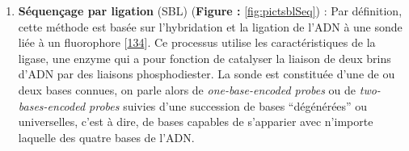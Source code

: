 \documentclass[12pt,a4paper,twoside]{ugathesis}
\providecommand{\tightlist}{%
  \setlength{\itemsep}{0pt}\setlength{\parskip}{0pt}}
\theoremstyle{definition}
\theoremstyle{definition}
\theoremstyle{definition}
\theoremstyle{remark}
\begin{document}
\newpage

\begin{enumerate}
\def\labelenumi{\arabic{enumi}.}
\setcounter{enumi}{1}
\tightlist
\item
  \textbf{Séquençage par ligation} (SBL) (\textbf{Figure :
  }\ref{fig:pictsblSeq}) : Par définition, cette méthode est basée sur
  l'hybridation et la ligation de l'ADN à une sonde liée à un
  fluorophore {[}\protect\hyperlink{ref-Tomkinson2006}{134}{]}. Ce
  processus utilise les caractéristiques de la ligase, une enzyme qui a
  pour fonction de catalyser la liaison de deux brins d'ADN par des
  liaisons phosphodiester. La sonde est constituée d'une de ou deux
  bases connues, on parle alors de \emph{one-base-encoded probes} ou de
  \emph{two-bases-encoded probes} suivies d'une succession de bases
  ``dégénérées'' ou universelles, c'est à dire, de bases capables de
  s'apparier avec n'importe laquelle des quatre bases de l'ADN.
\end{enumerate}
\end{document}
